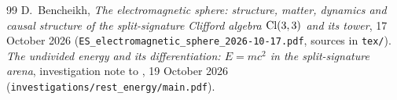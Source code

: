 \begin{thebibliography}{99}
 D.~Bencheikh, \emph{The electromagnetic sphere: structure, matter, dynamics and causal structure of the split-signature
Clifford algebra $\mathrm{Cl}(3,3)$ and its tower}, 17 October 2026 (\texttt{ES\_electromagnetic\_sphere\_2026-10-17.pdf}, sources in \texttt{tex/}).
 \emph{The undivided energy and its differentiation: $E=mc^2$ in the split-signature arena}, investigation note to \cite{ES17}, 19 October 2026 (\texttt{investigations/rest\_energy/main.pdf}).
\end{thebibliography}
